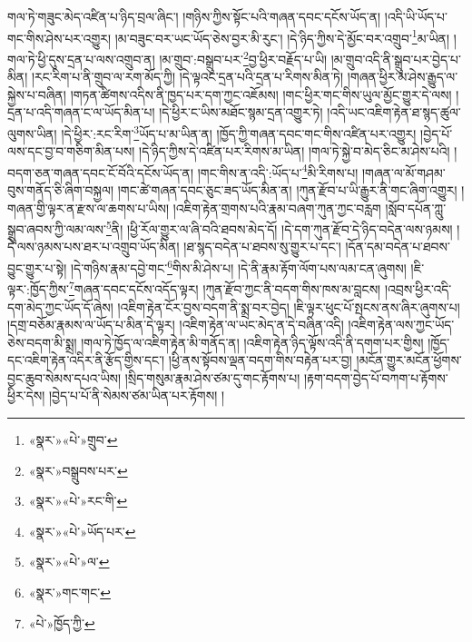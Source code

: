 གལ་ཏེ་གཟུང་མེད་འཛིན་པ་ཉིད་བྲལ་ཞིང་། །གཉིས་ཀྱིས་སྟོང་པའི་གཞན་དབང་དངོས་ཡོད་ན། །འདི་ཡི་ཡོད་པ་གང་གིས་ཤེས་པར་འགྱུར། །མ་བཟུང་བར་ཡང་ཡོད་ཅེས་བྱར་མི་རུང་། །དེ་ཉིད་ཀྱིས་དེ་མྱོང་བར་འགྲུབ་\footnote{«སྣར་»«པེ་»གྲུབ་}མ་ཡིན། །གལ་ཏེ་ཕྱི་དུས་དྲན་པ་ལས་འགྲུབ་ན། །མ་གྲུབ་:བསྒྲུབ་པར་\footnote{«སྣར་»བསྒྲུབས་པར་}བྱ་ཕྱིར་བརྗོད་པ་ཡི། །མ་གྲུབ་འདི་ནི་སྒྲུབ་པར་བྱེད་པ་མིན། །རང་རིག་པ་ནི་གྲུབ་ལ་རག་མོད་ཀྱི། །དེ་ལྟའང་དྲན་པའི་དྲན་པ་རིགས་མིན་ཏེ། །གཞན་ཕྱིར་མ་ཤེས་རྒྱུད་ལ་སྐྱེས་པ་བཞིན། །གཏན་ཚིགས་འདིས་ནི་ཁྱད་པར་དག་ཀྱང་འཇོམས། །གང་ཕྱིར་གང་གིས་ཡུལ་མྱོང་གྱུར་དེ་ལས། །དྲན་པ་འདི་གཞན་ང་ལ་ཡོད་མིན་པ། །དེ་ཕྱིར་ང་ཡིས་མཐོང་སྙམ་དྲན་འགྱུར་ཏེ། །འདི་ཡང་འཇིག་རྟེན་ཐ་སྙད་ཚུལ་ལུགས་ཡིན། །དེ་ཕྱིར་:རང་རིག་\footnote{«སྣར་»«པེ་»རང་གི་}ཡོད་པ་མ་ཡིན་ན། །ཁྱོད་ཀྱི་གཞན་དབང་གང་གིས་འཛིན་པར་འགྱུར། །བྱེད་པོ་ལས་དང་བྱ་བ་གཅིག་མིན་པས། །དེ་ཉིད་ཀྱིས་དེ་འཛིན་པར་རིགས་མ་ཡིན། །གལ་ཏེ་སྐྱེ་བ་མེད་ཅིང་མ་ཤེས་པའི། །བདག་ཅན་གཞན་དབང་ངོ་བོའི་དངོས་ཡོད་ན། །གང་གིས་ན་འདི་:ཡོད་པ་\footnote{«སྣར་»«པེ་»ཡོད་པར་}མི་རིགས་པ། །གཞན་ལ་མོ་གཤམ་བུས་གནོད་ཅི་ཞིག་བསྐྱལ། །གང་ཚེ་གཞན་དབང་ཅུང་ཟད་ཡོད་མིན་ན། །ཀུན་རྫོབ་པ་ཡི་རྒྱུར་ནི་གང་ཞིག་འགྱུར། །གཞན་གྱི་ལྟར་ན་རྫས་ལ་ཆགས་པ་ཡིས། །འཇིག་རྟེན་གྲགས་པའི་རྣམ་བཞག་ཀུན་ཀྱང་བརླག །སློབ་དཔོན་ཀླུ་སྒྲུབ་ཞབས་ཀྱི་ལམ་ལས་\footnote{«སྣར་»«པེ་»ལ་}ནི། །ཕྱི་རོལ་གྱུར་ལ་ཞི་བའི་ཐབས་མེད་དོ། །དེ་དག་ཀུན་རྫོབ་དེ་ཉིད་བདེན་ལས་ཉམས། །དེ་ལས་ཉམས་པས་ཐར་པ་འགྲུབ་ཡོད་མིན། །ཐ་སྙད་བདེན་པ་ཐབས་སུ་གྱུར་པ་དང་། །དོན་དམ་བདེན་པ་ཐབས་བྱུང་གྱུར་པ་སྟེ། །དེ་གཉིས་རྣམ་དབྱེ་གང་\footnote{«སྣར་»གང་གང་}གིས་མི་ཤེས་པ། །དེ་ནི་རྣམ་རྟོག་ལོག་པས་ལམ་ངན་ཞུགས། །ཇི་ལྟར་:ཁྱོད་ཀྱིས་\footnote{«པེ་»ཁྱོད་ཀྱི་}གཞན་དབང་དངོས་འདོད་ལྟར། །ཀུན་རྫོབ་ཀྱང་ནི་བདག་གིས་ཁས་མ་བླངས། །འབྲས་ཕྱིར་འདི་དག་མེད་ཀྱང་ཡོད་དོ་ཞེས། །འཇིག་རྟེན་ངོར་བྱས་བདག་ནི་སྨྲ་བར་བྱེད། །ཇི་ལྟར་ཕུང་པོ་སྤངས་ནས་ཞིར་ཞུགས་པ། །དགྲ་བཅོམ་རྣམས་ལ་ཡོད་པ་མིན་དེ་ལྟར། །འཇིག་རྟེན་ལ་ཡང་མེད་ན་དེ་བཞིན་འདི། །འཇིག་རྟེན་ལས་ཀྱང་ཡོད་ཅེས་བདག་མི་སྨྲ། །གལ་ཏེ་ཁྱོད་ལ་འཇིག་རྟེན་མི་གནོད་ན། །འཇིག་རྟེན་ཉིད་ལྟོས་འདི་ནི་དགག་པར་གྱིས། །ཁྱོད་དང་འཇིག་རྟེན་འདིར་ནི་རྩོད་གྱིས་དང་། །ཕྱི་ནས་སྟོབས་ལྡན་བདག་གིས་བརྟེན་པར་བྱ། །མངོན་གྱུར་མངོན་ཕྱོགས་བྱང་ཆུབ་སེམས་དཔའ་ཡིས། །སྲིད་གསུམ་རྣམ་ཤེས་ཙམ་དུ་གང་རྟོགས་པ། །རྟག་བདག་བྱེད་པོ་བཀག་པ་རྟོགས་ཕྱིར་དེས། །བྱེད་པ་པོ་ནི་སེམས་ཙམ་ཡིན་པར་རྟོགས། །
